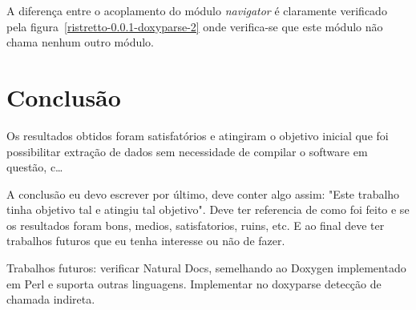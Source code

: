 A diferença entre o acoplamento do módulo {\it navigator} é claramente
verificado pela figura~\ref{ristretto-0.0.1-doxyparse-2} onde verifica-se que
este módulo não chama nenhum outro módulo.

\chapter{Conclusão} \label{ch:conclusao}

Os resultados obtidos foram satisfatórios e atingiram o objetivo inicial que
foi possibilitar extração de dados sem necessidade de compilar o software em
questão, c\ldots

A conclusão eu devo escrever por último, deve conter algo assim: "Este trabalho
tinha objetivo tal e atingiu tal objetivo". Deve ter referencia de como foi
feito e se os resultados foram bons, medios, satisfatorios, ruins, etc. E ao
final deve ter trabalhos futuros que eu tenha interesse ou não de fazer.

Trabalhos futuros: verificar Natural Docs, semelhando ao Doxygen implementado
em Perl e suporta outras linguagens. Implementar no doxyparse detecção de chamada
indireta.
